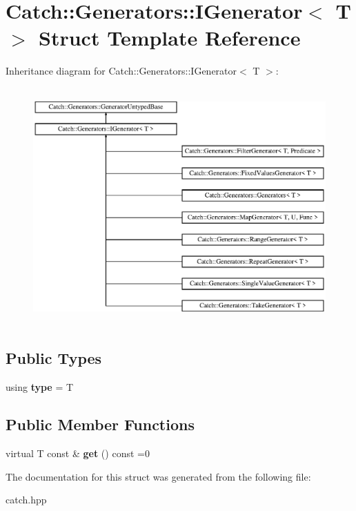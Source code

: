\hypertarget{structCatch_1_1Generators_1_1IGenerator}{}\section{Catch\+::Generators\+::I\+Generator$<$ T $>$ Struct Template Reference}
\label{structCatch_1_1Generators_1_1IGenerator}
Inheritance diagram for Catch\+::Generators\+::I\+Generator$<$ T $>$\+:\begin{figure}[H]
\begin{center}
\leavevmode
\includegraphics[height=9.090909cm]{structCatch_1_1Generators_1_1IGenerator}
\end{center}
\end{figure}
\subsection*{Public Types}
\begin{DoxyCompactItemize}
\item 
\mbox{\label{structCatch_1_1Generators_1_1IGenerator_a1f8677875fe0ff31f39c60d45504b9a5}} 
using {\bfseries type} = T
\end{DoxyCompactItemize}
\subsection*{Public Member Functions}
\begin{DoxyCompactItemize}
\item 
\mbox{\label{structCatch_1_1Generators_1_1IGenerator_a525d381fc9249a885b075a0632a8579a}} 
virtual T const  \& {\bfseries get} () const =0
\end{DoxyCompactItemize}


The documentation for this struct was generated from the following file\+:\begin{DoxyCompactItemize}
\item 
catch.\+hpp\end{DoxyCompactItemize}
